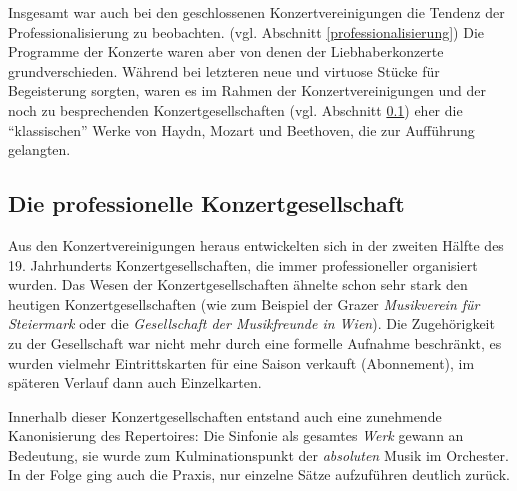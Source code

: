 \documentclass[a4paper, german, oneside]{scrbook}
\begin{document}
Insgesamt war auch bei den geschlossenen Konzertvereinigungen die Tendenz der Professionalisierung zu beobachten. (vgl. Abschnitt \ref{professionalisierung}) Die Programme der Konzerte waren aber von denen der Liebhaberkonzerte grundverschieden. Während bei letzteren neue und virtuose Stücke für Begeisterung sorgten, waren es im Rahmen der Konzertvereinigungen und der noch zu besprechenden Konzertgesellschaften (vgl. Abschnitt \ref{konzertgesellschaft}) eher die \enquote{klassischen} Werke von Haydn, Mozart und Beethoven, die zur Aufführung gelangten. \parencite[vgl.][22f.]{weber_music_2004}


\subsection{Die professionelle Konzertgesellschaft}
\label{konzertgesellschaft}
Aus den Konzertvereinigungen heraus entwickelten sich in der zweiten Hälfte des 19. Jahrhunderts Konzertgesellschaften, die immer professioneller organisiert wurden. Das Wesen der Konzertgesellschaften ähnelte schon sehr stark den heutigen Konzertgesellschaften (wie zum Beispiel der Grazer \emph{Musikverein für Steiermark} oder die \emph{Gesellschaft der Musikfreunde in Wien}). Die Zugehörigkeit zu der Gesellschaft war nicht mehr durch eine formelle Aufnahme beschränkt, es wurden vielmehr Eintrittskarten für eine Saison verkauft (Abonnement), im späteren Verlauf dann auch Einzelkarten. \parencite[vgl.][106]{heister_konzert:_1983}

Innerhalb dieser Konzertgesellschaften entstand auch eine zunehmende Kanonisierung des Repertoires: Die Sinfonie als gesamtes \emph{Werk} gewann an Bedeutung, sie wurde zum Kulminationspunkt der \emph{absoluten} Musik im Orchester. In der Folge ging auch die Praxis, nur einzelne Sätze aufzuführen deutlich zurück. \parencite[vgl.][231ff.]{muller_publikum_2014}
\end{document}
